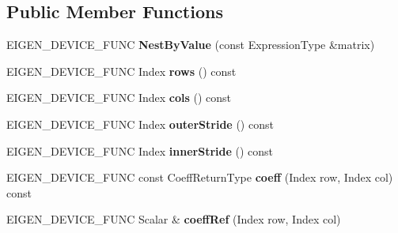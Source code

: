 \subsection*{Public Member Functions}
\begin{DoxyCompactItemize}
\item 
\mbox{\label{class_eigen_1_1_nest_by_value_a36ac9cd7a82641ad3f4c50451fee22e0}} 
E\+I\+G\+E\+N\+\_\+\+D\+E\+V\+I\+C\+E\+\_\+\+F\+U\+NC {\bfseries Nest\+By\+Value} (const Expression\+Type \&matrix)
\item 
\mbox{\label{class_eigen_1_1_nest_by_value_a6189cde894ab7404cea84cf16c3efd37}} 
E\+I\+G\+E\+N\+\_\+\+D\+E\+V\+I\+C\+E\+\_\+\+F\+U\+NC Index {\bfseries rows} () const
\item 
\mbox{\label{class_eigen_1_1_nest_by_value_a9eba96fa3c83f4b7c0aaf7d8fe052120}} 
E\+I\+G\+E\+N\+\_\+\+D\+E\+V\+I\+C\+E\+\_\+\+F\+U\+NC Index {\bfseries cols} () const
\item 
\mbox{\label{class_eigen_1_1_nest_by_value_a2de24c7efae5719c76ecb95546097746}} 
E\+I\+G\+E\+N\+\_\+\+D\+E\+V\+I\+C\+E\+\_\+\+F\+U\+NC Index {\bfseries outer\+Stride} () const
\item 
\mbox{\label{class_eigen_1_1_nest_by_value_ad9de9e6f7ca57353f5b2a700d6fc2ba2}} 
E\+I\+G\+E\+N\+\_\+\+D\+E\+V\+I\+C\+E\+\_\+\+F\+U\+NC Index {\bfseries inner\+Stride} () const
\item 
\mbox{\label{class_eigen_1_1_nest_by_value_a14659714e5f58e2d7cd79331c61552dd}} 
E\+I\+G\+E\+N\+\_\+\+D\+E\+V\+I\+C\+E\+\_\+\+F\+U\+NC const Coeff\+Return\+Type {\bfseries coeff} (Index row, Index col) const
\item 
\mbox{\label{class_eigen_1_1_nest_by_value_a465607f8c26fd6259b3a1ce8ed868d24}} 
E\+I\+G\+E\+N\+\_\+\+D\+E\+V\+I\+C\+E\+\_\+\+F\+U\+NC Scalar \& {\bfseries coeff\+Ref} (Index row, Index col)
\item 
\mbox{\label{class_eigen_1_1_nest_by_value_abe10ed49e85394e36573fe8c0a2409a9}} 

\end{DoxyCompactItemize}

